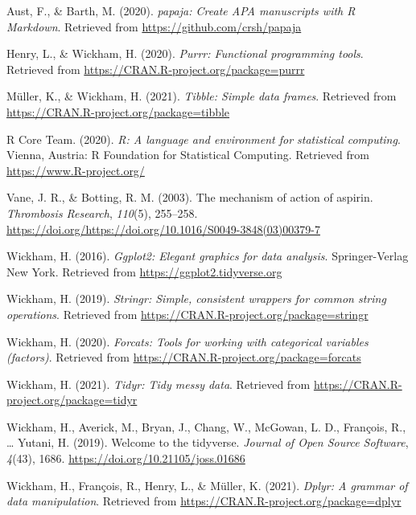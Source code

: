 \documentclass[
  english,
  doc,floatsintext]{apa6}
\newlength{\cslhangindent}
\newenvironment{cslreferences}%
  {\setlength{\parindent}{0pt}%
  \everypar{\setlength{\hangindent}{\cslhangindent}}\ignorespaces}%
  {\par}
\begin{document}
\hypertarget{refs}{}
\begin{cslreferences}
\leavevmode\hypertarget{ref-R-papaja}{}%
Aust, F., \& Barth, M. (2020). \emph{papaja: Create APA manuscripts with R Markdown}. Retrieved from \url{https://github.com/crsh/papaja}

\leavevmode\hypertarget{ref-R-purrr}{}%
Henry, L., \& Wickham, H. (2020). \emph{Purrr: Functional programming tools}. Retrieved from \url{https://CRAN.R-project.org/package=purrr}

\leavevmode\hypertarget{ref-R-tibble}{}%
Müller, K., \& Wickham, H. (2021). \emph{Tibble: Simple data frames}. Retrieved from \url{https://CRAN.R-project.org/package=tibble}

\leavevmode\hypertarget{ref-R-base}{}%
R Core Team. (2020). \emph{R: A language and environment for statistical computing}. Vienna, Austria: R Foundation for Statistical Computing. Retrieved from \url{https://www.R-project.org/}

\leavevmode\hypertarget{ref-VANE2003255}{}%
Vane, J. R., \& Botting, R. M. (2003). The mechanism of action of aspirin. \emph{Thrombosis Research}, \emph{110}(5), 255--258. \url{https://doi.org/https://doi.org/10.1016/S0049-3848(03)00379-7}

\leavevmode\hypertarget{ref-R-ggplot2}{}%
Wickham, H. (2016). \emph{Ggplot2: Elegant graphics for data analysis}. Springer-Verlag New York. Retrieved from \url{https://ggplot2.tidyverse.org}

\leavevmode\hypertarget{ref-R-stringr}{}%
Wickham, H. (2019). \emph{Stringr: Simple, consistent wrappers for common string operations}. Retrieved from \url{https://CRAN.R-project.org/package=stringr}

\leavevmode\hypertarget{ref-R-forcats}{}%
Wickham, H. (2020). \emph{Forcats: Tools for working with categorical variables (factors)}. Retrieved from \url{https://CRAN.R-project.org/package=forcats}

\leavevmode\hypertarget{ref-R-tidyr}{}%
Wickham, H. (2021). \emph{Tidyr: Tidy messy data}. Retrieved from \url{https://CRAN.R-project.org/package=tidyr}

\leavevmode\hypertarget{ref-R-tidyverse}{}%
Wickham, H., Averick, M., Bryan, J., Chang, W., McGowan, L. D., François, R., \ldots{} Yutani, H. (2019). Welcome to the tidyverse. \emph{Journal of Open Source Software}, \emph{4}(43), 1686. \url{https://doi.org/10.21105/joss.01686}

\leavevmode\hypertarget{ref-R-dplyr}{}%
Wickham, H., François, R., Henry, L., \& Müller, K. (2021). \emph{Dplyr: A grammar of data manipulation}. Retrieved from \url{https://CRAN.R-project.org/package=dplyr}


\end{cslreferences}
\end{document}
